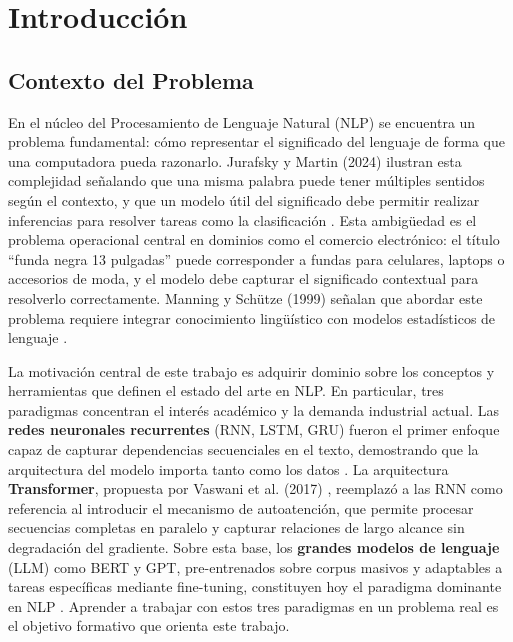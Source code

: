 \documentclass[11pt,a4paper]{article}
\begin{document}
\tableofcontents
\newpage

\pagestyle{mainpages}

\section{Introducción}

\subsection{Contexto del Problema}

En el núcleo del Procesamiento de Lenguaje Natural (NLP) se encuentra un problema fundamental: cómo representar el significado del lenguaje de forma que una computadora pueda razonarlo. Jurafsky y Martin (2024) ilustran esta complejidad señalando que una misma palabra puede tener múltiples sentidos según el contexto, y que un modelo útil del significado debe permitir realizar inferencias para resolver tareas como la clasificación \cite{jurafsky2024}. Esta ambigüedad es el problema operacional central en dominios como el comercio electrónico: el título ``funda negra 13 pulgadas'' puede corresponder a fundas para celulares, laptops o accesorios de moda, y el modelo debe capturar el significado contextual para resolverlo correctamente. Manning y Schütze (1999) señalan que abordar este problema requiere integrar conocimiento lingüístico con modelos estadísticos de lenguaje \cite{manning1999}.

La motivación central de este trabajo es adquirir dominio sobre los conceptos y herramientas que definen el estado del arte en NLP. En particular, tres paradigmas concentran el interés académico y la demanda industrial actual. Las \textbf{redes neuronales recurrentes} (RNN, LSTM, GRU) fueron el primer enfoque capaz de capturar dependencias secuenciales en el texto, demostrando que la arquitectura del modelo importa tanto como los datos \cite{hochreiter1997,cho2014}. La arquitectura \textbf{Transformer}, propuesta por Vaswani et al. (2017) \cite{vaswani2017}, reemplazó a las RNN como referencia al introducir el mecanismo de autoatención, que permite procesar secuencias completas en paralelo y capturar relaciones de largo alcance sin degradación del gradiente. Sobre esta base, los \textbf{grandes modelos de lenguaje} (LLM) como BERT y GPT, pre-entrenados sobre corpus masivos y adaptables a tareas específicas mediante fine-tuning, constituyen hoy el paradigma dominante en NLP \cite{devlin2019,zhao2023}. Aprender a trabajar con estos tres paradigmas en un problema real es el objetivo formativo que orienta este trabajo.
\end{document}
